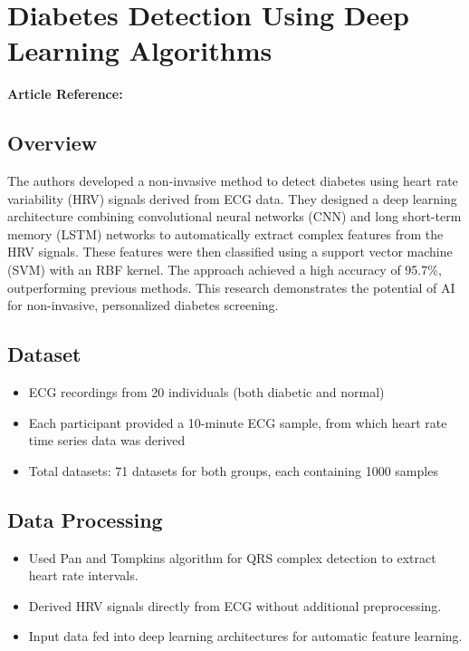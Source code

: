 \section{Diabetes Detection Using Deep Learning Algorithms}
\textbf{Article Reference:} \cite{article_4}

\subsection*{Overview}
The authors developed a non-invasive method to detect diabetes using heart rate variability (HRV) signals derived from ECG data. They designed a deep learning architecture combining convolutional neural networks (CNN) and long short-term memory (LSTM) networks to automatically extract complex features from the HRV signals. These features were then classified using a support vector machine (SVM) with an RBF kernel. The approach achieved a high accuracy of 95.7\%, outperforming previous methods. This research demonstrates the potential of AI for non-invasive, personalized diabetes screening.

\subsection*{Dataset}
\begin{itemize}
    \item ECG recordings from 20 individuals (both diabetic and normal)
    \item Each participant provided a 10-minute ECG sample, from which heart rate time series data was derived
    \item Total datasets: 71 datasets for both groups, each containing 1000 samples
\end{itemize}

\subsection*{Data Processing}
\begin{itemize}
    \item Used Pan and Tompkins algorithm for QRS complex detection to extract heart rate intervals.
    \item Derived HRV signals directly from ECG without additional preprocessing.
    \item Input data fed into deep learning architectures for automatic feature learning.
\end{itemize}

